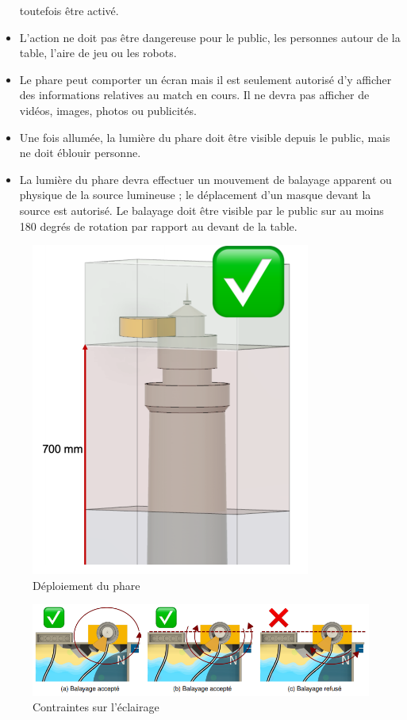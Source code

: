 \documentclass{article}
\begin{document}
\begin{itemize}
toutefois être activé.
\item L’action ne doit pas être dangereuse pour le public, les personnes autour de la table, l’aire de jeu ou les
robots.
\item Le phare peut comporter un écran mais il est seulement autorisé d’y afficher des informations relatives
au match en cours. Il ne devra pas afficher de vidéos, images, photos ou publicités.
\item Une fois allumée, la lumière du phare doit être visible depuis le public, mais ne doit éblouir personne.
\item La lumière du phare devra effectuer un mouvement de balayage apparent ou physique de la source
lumineuse ; le déplacement d’un masque devant la source est autorisé. Le balayage doit être visible par
le public sur au moins 180 degrés de rotation par rapport au devant de la table.
\end{itemize}

\begin{figure}[!h]
\centering
\includegraphics[scale=0.7]{Pictures/deploiement.png}
\caption{Déploiement du phare}
\end{figure}

\begin{figure}[!h]
\centering
\includegraphics[scale=0.7]{Pictures/eclairage.png}
\caption{Contraintes sur l'éclairage}
\end{figure}
\end{document}
